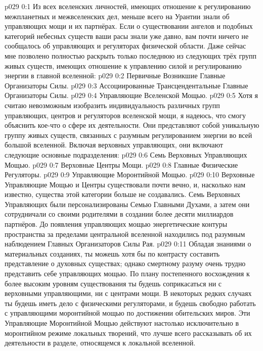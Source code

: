 \author{Всеобщий Цензор}
\vs p029 0:1 Из всех вселенских личностей, имеющих отношение к регулированию межпланетных и межвселенских дел, меньше всего на Урантии знали об управляющих мощи и их партнёрах. Если о существовании ангелов и подобных категорий небесных существ ваши расы знали уже давно, вам почти ничего не сообщалось об управляющих и регуляторах физической области. Даже сейчас мне позволено полностью раскрыть только последнюю из следующих трёх групп живых существ, имеющих отношение к управлению силой и регулированию энергии в главной вселенной:
\vs p029 0:2 Первичные Возникшие Главные Организаторы Силы.
\vs p029 0:3 Ассоциированные Трансцендентальные Главные Организаторы Силы.
\vs p029 0:4 Управляющие Вселенской Мощью.
\vs p029 0:5 \pc Хотя я считаю невозможным изобразить индивидуальность различных групп управляющих, центров и регуляторов вселенской мощи, я надеюсь, что смогу объяснить кое\hyp{}что о сфере их деятельности. Они представляют собой уникальную группу живых существ, связанных с разумным регулированием энергии во всей большой вселенной. Включая верховных управляющих, они включают следующие основные подразделения:
\vs p029 0:6 Семь Верховных Управляющих Мощью.
\vs p029 0:7 Верховные Центры Мощи.
\vs p029 0:8 Главные Физические Регуляторы.
\vs p029 0:9 Управляющие Моронтийной Мощью.
\vs p029 0:10 \pc Верховные Управляющие Мощью и Центры существовали почти вечно, и, насколько нам известно, существа этой категории больше не создавались. Семь Верховных Управляющих были персонализированы Семью Главными Духами, а затем они сотрудничали со своими родителями в создании более десяти миллиардов партнёров. До появления управляющих мощью энергетические контуры пространства за пределами центральной вселенной находились под разумным наблюдением Главных Организаторов Силы Рая.
\vs p029 0:11 Обладая знаниями о материальных созданиях, ты можешь хотя бы по контрасту составить представление о духовных существах; однако смертному разуму очень трудно представить себе управляющих мощью. По плану постепенного восхождения к более высоким уровням существования ты будешь соприкасаться ни с верховными управляющими, ни с центрами мощи. В некоторых редких случаях ты будешь иметь дело с физическими регуляторами, и будешь свободно работать с управляющими моронтийной мощью по достижении обительских миров. Эти Управляющие Моронтийной Мощью действуют настолько исключительно в моронтийном режиме локальных творений, что лучше всего рассказывать об их деятельности в разделе, относящемся к локальной вселенной.
